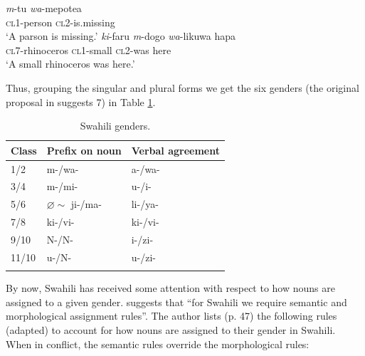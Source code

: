 \begin{exe}
    \ex
    \begin{xlist}
        \ex \label{swahili-class-exe-cl1}
        \gll \textit{m}-tu \textit{wa}-mepotea\\ 
        {} \textsc{cl1}-person \textsc{cl2}-is.missing\\
        \glt `A parson is missing.'
        \ex \label{swahili-class-exe-cl2}
        \gll \textit{ki}-faru \textit{m}-dogo \textit{wa}-likuwa hapa\\
        {} \textsc{cl7}-rhinoceros \textsc{cl1}-small \textsc{cl2}-was here\\
        \glt `A small rhinoceros was here.'
    \end{xlist}
\end{exe}

Thus, grouping the singular and plural forms we get the six genders (the  original proposal in \textcite[p. 47]{Corbett.1991} suggests 7) in Table \ref{tab:genders-swahili}.

\begin{table}[!htpb]
  \centering
  \begin{tabular}{lll}
    \lsptoprule
    Class & Prefix on noun             & Verbal agreement \\
    \midrule
    1/2   & m-/wa-                     & a-/wa-           \\
    3/4   & m-/mi-                     & u-/i-            \\
    5/6   & $\varnothing \sim$ ji-/ma- & li-/ya-          \\
    7/8   & ki-/vi-                    & ki-/vi-          \\
    9/10  & N-/N-                      & i-/zi-           \\
    11/10 & u-/N-                      & u-/zi-           \\
    \lspbottomrule
  \end{tabular}
  \caption{Swahili genders.}\label{tab:genders-swahili}
\end{table}

By now, Swahili has received some attention with respect to how nouns are assigned to a given gender. \textcite[p. 47]{Corbett.1991} suggests that ``for Swahili we require semantic and morphological assignment rules''. The author lists (p. 47) the following rules (adapted) to account for how nouns are assigned to their gender in Swahili. When in conflict, the semantic rules override the morphological rules:

